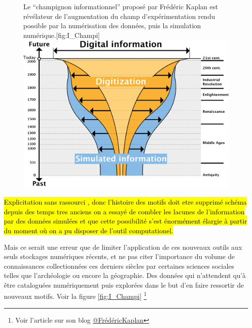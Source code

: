 \begin{figure}[!h]
\begin{sidecaption}[fortoc]{Le \enquote{champignon informationnel} proposé par Frédéric Kaplan est révélateur de l'augmentation du champ d'expérimentation rendu possible par la numérisation des données, puis la simulation numérique.}[fig:I_Champi]
 \centering
 \includegraphics[width=\linewidth]{champignonKaplan.png}
  \end{sidecaption}
\end{figure}

\hl{Explicitation sans rassourci , donc l'histoire des motifs doit etre supprimé
schéma depuis des temps tres anciens on a essayé de combler les lacunes de l'information par des données simulées et que cette possibilité s'est énormément élargie à partir du moment où on a pu disposer de l'outil computationel.}

Mais ce serait une erreur que de limiter l'application de ces nouveaux outils aux seuls stockages numériques récents, et ne pas citer l'importance du volume de connaissances collectionnées ces derniers siècles par certaines sciences sociales telles que l'archéologie ou encore la géographie. Des données qui n'attendent qu'à être cataloguées numériquement puis explorées dans le but d'en faire ressortir de nouveaux motifs. Voir la figure \ref{fig:I_Champi} \footnote{Voir l'article sur son blog \href{http://fkaplan.wordpress.com/2013/03/14/lancement-de-la-venice-time-machine/}{@FrédéricKaplan}}


